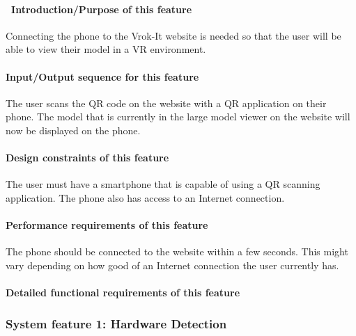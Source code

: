 \documentclass[letterpaper, 10pt, draftclsnofoot, onecolumn]{IEEEtran}
\begin{document}
{\paragraph[\ Introduction/Purpose of this
feature]{\foreignlanguage{english}{\ }\foreignlanguage{english}{Introduction/Purpose
of this feature}}
{\color{black}
Connecting the phone to the Vrok-It website is needed so that the user will be able to view their model in a VR environment. }

\paragraph[Input/Output sequence for this
feature]{\rmfamily\bfseries\color{black}
Input/Output sequence for this feature}
{\color{black}
The user scans the QR code on the website with a QR application on their phone. The model that is currently in the large model viewer on 
the website will now be displayed on the phone. }

\paragraph[Design constraints of this
feature]{\rmfamily\bfseries\color{black} Design
constraints of this feature}
{\color{black}
The user must have a smartphone that is capable of using a QR scanning application. The phone also has access to an Internet connection. }

\paragraph[Performance requirements of this
feature]{\rmfamily\bfseries\color{black}
Performance requirements of this feature}
{\color{black}
The phone should be connected to the website within a few seconds. This might vary depending on how good of an Internet connection the user currently 
has. }

\paragraph[Detailed functional requirements of this
feature]{\rmfamily\bfseries\color{black}
Detailed functional requirements of this feature}


\subsubsection[{Hardware Detection}]{\rmfamily\bfseries\color{black} System
feature 1: Hardware Detection}
}
\end{document}
